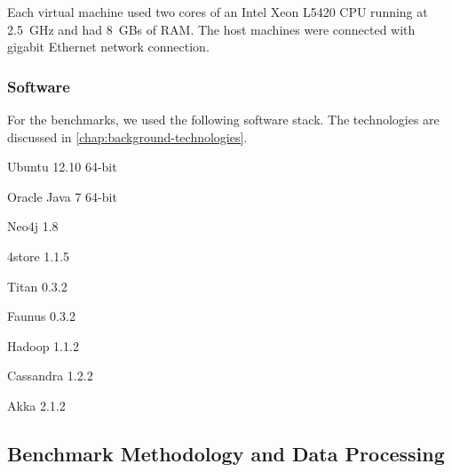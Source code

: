 Each virtual machine used two cores of an Intel Xeon L5420 CPU running at 2.5~GHz and had 8~GBs of RAM. The host machines were connected with gigabit Ethernet network connection.

\subsubsection{Software}

For the benchmarks, we used the following software stack. The technologies are discussed in \autoref{chap:background-technologies}.

\begin{itemize*}
    \item Ubuntu 12.10 64-bit
    \item Oracle Java 7 64-bit
    \item Neo4j 1.8
    \item 4store 1.1.5
    \item Titan 0.3.2
      \item Faunus 0.3.2
      \item Hadoop 1.1.2
      \item Cassandra 1.2.2
    \item Akka 2.1.2
\end{itemize*}

\subsection{Benchmark Methodology and Data Processing}
\label{benchmark-methodology}

